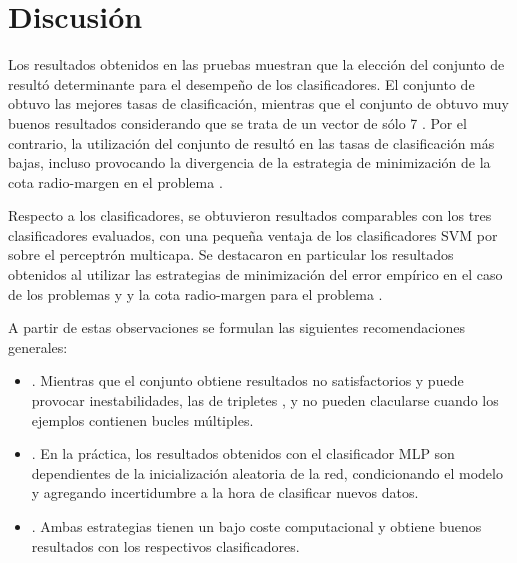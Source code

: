 %
%
%
\section{Discusión}
%
Los resultados obtenidos en las pruebas muestran que la elección del
conjunto de  resultó determinante para el desempeño de los
clasificadores.
El conjunto de   obtuvo las mejores tasas de
clasificación, mientras que el conjunto de   obtuvo
muy buenos resultados considerando que se trata de un vector de sólo 7
.
Por el contrario, la utilización del conjunto de  
resultó en las tasas de clasificación más bajas, incluso provocando la
divergencia de la estrategia de minimización de la cota radio-margen
en el problema \prob\mipred{}.

Respecto a los clasificadores, se obtuvieron resultados comparables
con los tres clasificadores evaluados, con una pequeña ventaja de los
clasificadores SVM por sobre el perceptrón multicapa.
Se destacaron en particular los resultados obtenidos al utilizar las
estrategias de minimización del error empírico en el caso de los
problemas \prob\mipred{} y \prob\micropred{} y la cota radio-margen
para el problema \prob\tripletsvm{}.

A partir de estas observaciones se formulan las siguientes
recomendaciones generales:
%
\begin{itemize}
\item
  .
  Mientras que el conjunto  obtiene resultados no
  satisfactorios y puede provocar inestabilidades, las  de
  tripletes ,  y  no pueden clacularse
  cuando los ejemplos contienen bucles múltiples.
\item
  .
  En la práctica, los resultados obtenidos con el clasificador MLP son
  dependientes de la inicialización aleatoria de la red, condicionando
  el modelo y agregando incertidumbre a la hora de clasificar nuevos
  datos.
\item
  .
  Ambas estrategias tienen un bajo coste computacional y obtiene
  buenos resultados con los respectivos clasificadores.
\end{itemize}
%
